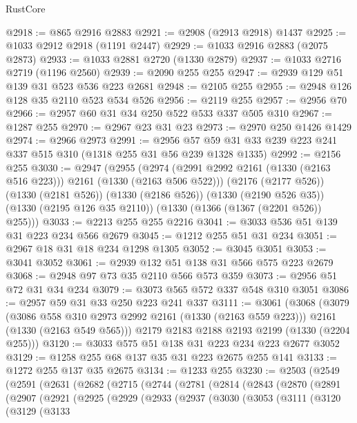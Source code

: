 \begin{lexlean}{RustCore}
\begin{coremodule}
{\begin{coremodule}
{{{{{{{{@2918 := @865 @2916 @2883
@2921 := @2908 (@2913 @2918) @1437
@2925 := @1033 @2912 @2918 (@1191 @2447)
@2929 := @1033 @2916 @2883 (@2075 @2873)
@2933 := @1033 @2881 @2720 (@1330 @2879)
@2937 := @1033 @2716 @2719 (@1196 @2560)
@2939 := @2090 @255 @255
@2947 := @2939 @129 @51 @139 @31 @523 @536 @223 @2681
@2948 := @2105 @255
@2955 := @2948 @126 @128 @35 @2110 @523 @534 @526
@2956 := @2119 @255
@2957 := @2956 @70
@2966 := @2957 @60 @31 @34 @250 @522 @533 @337 @505 @310
@2967 := @1287 @255
@2970 := @2967 @23 @31 @23
@2973 := @2970 @250 @1426 @1429
@2974 := @2966 @2973
@2991 := @2956 @57 @59 @31 @33 @239 @223 @241 @337 @515 @310 (@1318 @255 @31 @56 @239 @1328 @1335)
@2992 := @2156 @255
@3030 := @2947
    (@2955
      (@2974 (@2991 @2992 @2161 (@1330 (@2163 @516 @223))) @2161 (@1330 (@2163 @506 @522)))
      (@2176 (@2177 @526))
      (@1330 (@2181 @526))
      (@1330 (@2186 @526))
      (@1330 (@2190 @526 @35))
      (@1330 (@2195 @126 @35 @2110))
      (@1330 (@1366 (@1367 (@2201 @526)) @255)))
@3033 := @2213 @255 @255 @2216
@3041 := @3033 @536 @51 @139 @31 @223 @234 @566 @2679
@3045 := @1212 @255 @51 @31 @234
@3051 := @2967 @18 @31 @18 @234 @1298 @1305
@3052 := @3045 @3051
@3053 := @3041 @3052
@3061 := @2939 @132 @51 @138 @31 @566 @575 @223 @2679
@3068 := @2948 @97 @73 @35 @2110 @566 @573 @359
@3073 := @2956 @51 @72 @31 @34 @234
@3079 := @3073 @565 @572 @337 @548 @310 @3051
@3086 := @2957 @59 @31 @33 @250 @223 @241 @337
@3111 := @3061
    (@3068
      (@3079
        (@3086 @558 @310 @2973 @2992 @2161 (@1330 (@2163 @559 @223)))
        @2161
        (@1330 (@2163 @549 @565)))
      @2179
      @2183
      @2188
      @2193
      @2199
      (@1330 (@2204 @255)))
@3120 := @3033 @575 @51 @138 @31 @223 @234 @223 @2677 @3052
@3129 := @1258 @255 @68 @137 @35 @31 @223 @2675 @255 @141
@3133 := @1272 @255 @137 @35 @2675
@3134 := @1233 @255
@3230 := @2503
    (@2549
      (@2591
        (@2631
          (@2682
            (@2715
              (@2744
                (@2781
                  (@2814
                    (@2843
                      (@2870
                        (@2891
                          (@2907
                            (@2921
                              (@2925
                                (@2929
                                  (@2933
                                    (@2937
                                      (@3030
                                        (@3053
                                          (@3111
                                            (@3120
                                              (@3129
                                                (@3133
}}}}}}}}
\end{coremodule}}
\end{coremodule}
\end{lexlean}
